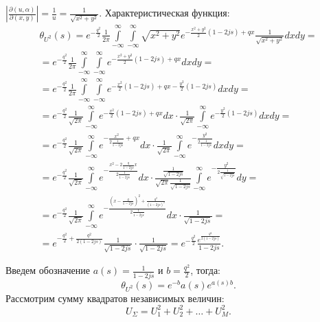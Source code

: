 \documentclass[a4paper,12pt]{article}
\newcommand{\modulus}[1]{\left | #1 \right |}
\begin{document}
    $\modulus{\frac{\partial (u,\alpha)}{\partial (x,y)}} = \frac{1}{u} = \frac{1}{\sqrt{x^2 + y^2}}$. Характеристическая функция:
    \begin{multline*}
        \theta_{U^2}(s)
        = e^{- \frac{q^2}{2}} \frac{1}{2 \pi} \int \limits_{-\infty}^{\infty} \int \limits_{-\infty}^{\infty} \sqrt{x^2 + y^2} e^{- \frac{x^2 + y^2}{2} ( 1 - 2 j s) + q x} \frac{1}{\sqrt{x^2 + y^2}}dx dy = \\
        = e^{- \frac{q^2}{2}} \frac{1}{2 \pi} \int \limits_{-\infty}^{\infty} \int \limits_{-\infty}^{\infty} e^{- \frac{x^2 + y^2}{2} ( 1 - 2 j s) + q x} dx dy = \\
        = e^{- \frac{q^2}{2}} \frac{1}{2 \pi} \int \limits_{-\infty}^{\infty} \int \limits_{-\infty}^{\infty} e^{- \frac{x^2}{2} ( 1 - 2 j s) + q x - \frac{y^2}{2} ( 1 - 2 j s)} dx dy = \\
        = e^{- \frac{q^2}{2}} \frac{1}{\sqrt{2 \pi}} \int \limits_{-\infty}^{\infty} e^{- \frac{x^2}{2} ( 1 - 2 j s) + q x} dx \cdot \frac{1}{\sqrt{2 \pi}} \int \limits_{-\infty}^{\infty} e^{- \frac{y^2}{2} ( 1 - 2 j s)} dx dy = \\
        = e^{- \frac{q^2}{2}} \frac{1}{\sqrt{2 \pi}} \int \limits_{-\infty}^{\infty} e^{- \frac{x^2}{2 \frac{1}{1 - 2 j s}}  + q x} dx \cdot \frac{1}{\sqrt{2 \pi}} \int \limits_{-\infty}^{\infty} e^{- \frac{y^2}{2 \frac{1}{1 - 2 j s}}} dx dy = \\
        = e^{- \frac{q^2}{2}} \frac{1}{\sqrt{2 \pi}} \int \limits_{-\infty}^{\infty} e^{- \frac{x^2 - 2 \frac{q}{1 - 2 j s} x}{2 \frac{1}{ 1 - 2 j s}}} dx \cdot \frac{\frac{1}{\sqrt{1 - 2 j s}}}{\sqrt{2 \pi} \frac{1}{\sqrt{1 - 2 j s}}} \int \limits_{-\infty}^{\infty} e^{- \frac{y^2}{2 \frac{1}{\sqrt{1 - 2 j s}}}} dy = \\
        = e^{- \frac{q^2}{2}} \frac{1}{\sqrt{2 \pi}} \int \limits_{-\infty}^{\infty} e^{- \frac{\left ( x - \frac{q}{1 - 2 j s} \right )^2 + \frac{q^2}{(1 - 2 j s)^2}}{2 \frac{1}{1 - 2 j s}}} dx \cdot \frac{1}{\sqrt{1 - 2 j s}} = \\
        = e^{- \frac{q^2}{2} + \frac{q^2}{2 (1 - 2 j s)}} \frac{1}{\sqrt{1 - 2 j s}} \cdot \frac{1}{\sqrt{1 - 2 j s}}
        = e^{- \frac{q^2}{2}} \frac{e^{\frac{q^2}{2 (1 - 2 j s)}}}{1 - 2 j s} .
    \end{multline*}

    Введем обозначение $a(s) = \frac{1}{1 - 2 j s}$ и $b = \frac{q^2}{2}$, тогда:
    \[
        \theta_{U^2}(s) = e^{-b} a(s) e^{a(s) b} .
    \]
    Рассмотрим сумму квадратов независимых величин:
    \[
        U_{\Sigma} = U_1^2 + U_2^2 + \dots + U_M^2 .
    \]
\end{document}
